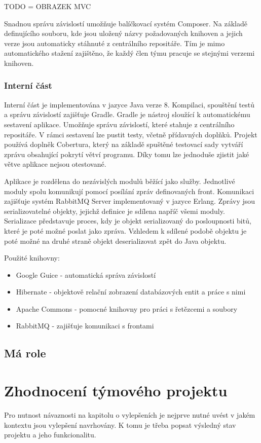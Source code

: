 \documentclass[thesis=B,czech]{FITthesis}[2012/06/26]
\begin{document}
TODO = OBRAZEK MVC
\par
Snadnou správu závislostí umožňuje balíčkovací systém Composer. 
Na základě definujícího souboru, kde jsou uložený názvy požadovaných knihoven a jejich verze jsou automaticky 
stáhnuté z centrálního repositáře. Tím je mimo automatického stažení zajištěno, že každý člen týmu pracuje se stejnými verzemi knihoven.
\subsection{Interní část}
Interní část je implementována v jazyce Java verze 8. Kompilaci, spouštění testů a správu závislostí zajišťuje Gradle.
Gradle je nástroj sloužící k automatickému sestavení aplikace. Umožňuje správu závislostí, které stahuje z centrálního repositáře. V rámci sestavení lze pustit testy, včetně přídavných doplňků. Projekt používá
doplněk Cobertura, který na základě spuštěné testovací sady vytváří zprávu obsahující pokrytí větví programu.
Díky tomu lze jednoduše zjistit jaké větve aplikace nejsou otestované.
\par
Aplikace je rozdělena do nezávislých modulů běžící jako služby. Jednotlivé moduly spolu komunikují
pomocí posílání zpráv definovaných front. Komunikaci zajišťuje systém RabbitMQ Server implementovaný v jazyce Erlang. Zprávy jsou serializovatelné objekty, jejichž definice je sdílena napříč všemi moduly.
Serializace představuje proces, kdy je objekt serializovaný do posloupnosti bitů, které je poté
možné poslat jako zpráva. Vzhledem k sdílené podobě objektu je poté možné na druhé straně
objekt deserializovat zpět do Java objektu.

\par
Použité knihovny:
\begin{itemize}
\item Google Guice - automatická správa závislostí
\item Hibernate - objektově relační zobrazení databázových entit a práce s nimi
\item Apache Commons - pomocné knihovny pro práci s řetězcemi a soubory
\item RabbitMQ - zajišťuje komunikaci s frontami
\end{itemize}

\section{Má role}

\chapter{Zhodnocení týmového projektu}
Pro nutnost návaznosti na kapitolu o vylepšeních je nejprve nutné uvést v jakém kontextu jsou vylepšení navrhovány. K tomu je třeba
popsat výsledný stav projektu a jeho funkcionalitu. 
\end{document}
